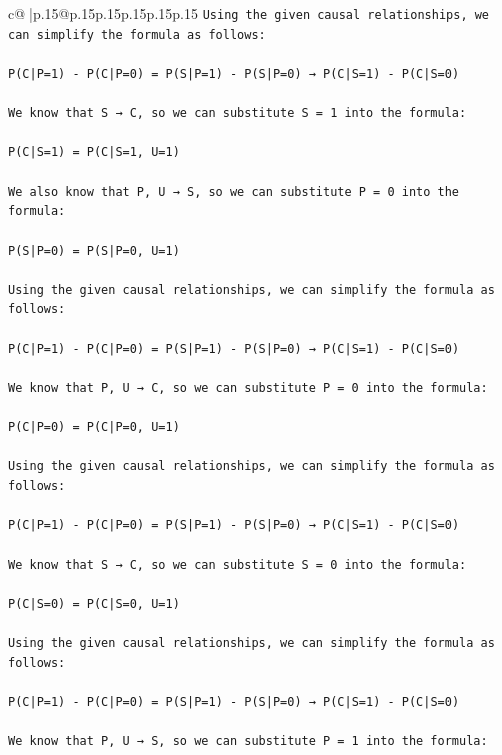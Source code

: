 \documentclass{article}
\begin{document}
{\begin{supertabular}{c@{$\;$}|p{.15\linewidth}@{}p{.15\linewidth}p{.15\linewidth}p{.15\linewidth}p{.15\linewidth}p{.15\linewidth}}
{{{\texttt{Using the given causal relationships, we can simplify the formula as follows:} \\
\\ 
\texttt{P(C|P=1) {-} P(C|P=0) = P(S|P=1) {-} P(S|P=0) → P(C|S=1) {-} P(C|S=0)} \\
\\ 
\texttt{We know that S → C, so we can substitute S = 1 into the formula:} \\
\\ 
\texttt{P(C|S=1) = P(C|S=1, U=1)} \\
\\ 
\texttt{We also know that P, U → S, so we can substitute P = 0 into the formula:} \\
\\ 
\texttt{P(S|P=0) = P(S|P=0, U=1)} \\
\\ 
\texttt{Using the given causal relationships, we can simplify the formula as follows:} \\
\\ 
\texttt{P(C|P=1) {-} P(C|P=0) = P(S|P=1) {-} P(S|P=0) → P(C|S=1) {-} P(C|S=0)} \\
\\ 
\texttt{We know that P, U → C, so we can substitute P = 0 into the formula:} \\
\\ 
\texttt{P(C|P=0) = P(C|P=0, U=1)} \\
\\ 
\texttt{Using the given causal relationships, we can simplify the formula as follows:} \\
\\ 
\texttt{P(C|P=1) {-} P(C|P=0) = P(S|P=1) {-} P(S|P=0) → P(C|S=1) {-} P(C|S=0)} \\
\\ 
\texttt{We know that S → C, so we can substitute S = 0 into the formula:} \\
\\ 
\texttt{P(C|S=0) = P(C|S=0, U=1)} \\
\\ 
\texttt{Using the given causal relationships, we can simplify the formula as follows:} \\
\\ 
\texttt{P(C|P=1) {-} P(C|P=0) = P(S|P=1) {-} P(S|P=0) → P(C|S=1) {-} P(C|S=0)} \\
\\ 
\texttt{We know that P, U → S, so we can substitute P = 1 into the formula:} \\
}}}
\end{supertabular}}
\end{document}
